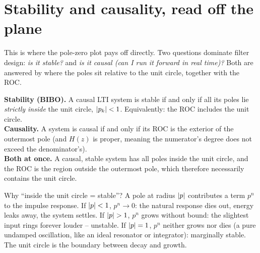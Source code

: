 \section{Stability and causality, read off the plane}
\label{ch15:stability}

This is where the pole-zero plot pays off directly. Two questions dominate filter design:
\emph{is it stable?} and \emph{is it causal (can I run it forward in real time)?} Both
are answered by where the poles sit relative to the unit circle, together with the ROC.

\begin{formalbox}
\textbf{Stability (BIBO).} A causal LTI system is stable if and only if all its poles lie
\emph{strictly inside} the unit circle, $\lvert p_k\rvert<1$. Equivalently: the ROC includes the
unit circle. \\[0.3em]
\textbf{Causality.} A system is causal if and only if its ROC is the exterior of the
outermost pole (and $H(z)$ is proper, meaning the numerator's degree does not exceed the denominator's). \\[0.3em]
\textbf{Both at once.} A causal, stable system has all poles inside the unit circle, and
the ROC is the region outside the outermost pole, which therefore necessarily contains the
unit circle.
\end{formalbox}

\begin{intuitionbox}
Why ``inside the unit circle = stable''? A pole at radius $\lvert p\rvert$ contributes a term
$p^n$ to the impulse response. If $\lvert p\rvert<1$, $p^n\to 0$: the natural response dies out,
energy leaks away, the system settles. If $\lvert p\rvert>1$, $p^n$ grows without bound: the
slightest input rings forever louder -- unstable. If $\lvert p\rvert=1$, $p^n$ neither grows nor
dies (a pure undamped oscillation, like an ideal resonator or integrator): marginally
stable. The unit circle is the boundary
between decay and growth.
\end{intuitionbox}

